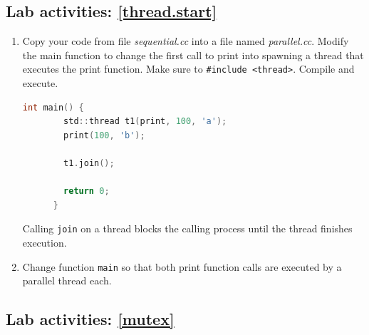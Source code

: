 \documentclass[12pt]{book}
\begin{document}



  \subsection{Lab activities: \ref{thread.start}}

  \begin{enumerate}[resume*]
  \item Copy your code from file \emph{sequential.cc}  into a file named \emph{parallel.cc}. Modify the main function to change the first call to print into spawning a thread that executes the print function. Make sure to \lstinline$#include <thread>$. Compile and execute.

    \begin{lstlisting}[language=c]
      int main() {
        std::thread t1(print, 100, 'a');
        print(100, 'b');

        t1.join();
        
        return 0;
      }
    \end{lstlisting}

    Calling \verb$join$ on a thread blocks the calling process until the thread finishes execution.

    \item Change function \verb$main$ so that both print function calls are executed by a parallel thread each.
  \end{enumerate}


  \subsection{Lab activities: \ref{mutex}}
\end{document}
